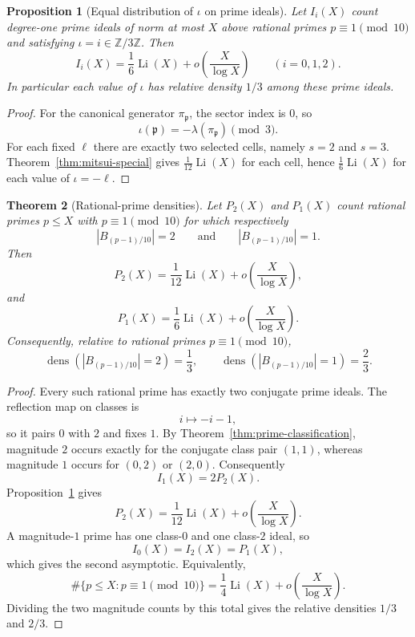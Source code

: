 \documentclass[12pt]{amsart}
\newtheorem{theorem}{Theorem}[section]
\newtheorem{proposition}[theorem]{Proposition}
\theoremstyle{definition}
\theoremstyle{remark}
\newcommand{\ZZ}{\mathbb{Z}}
\begin{document}
\begin{proposition}[Equal distribution of $\iota$ on prime ideals]
\label{prop:iota-density}
Let $I_i(X)$ count degree-one prime ideals of norm at most $X$ above
rational primes $p\equiv1\pmod{10}$ and satisfying
$\iota=i\in\ZZ/3\ZZ$.  Then
\[
  I_i(X)=\frac16\operatorname{Li}(X)
  +o\!\left(\frac{X}{\log X}\right)
  \qquad(i=0,1,2).
\]
In particular each value of $\iota$ has relative density $1/3$ among
these prime ideals.
\end{proposition}

\begin{proof}
For the canonical generator $\pi_{\mathfrak p}$, the sector index is
$0$, so
\[
  \iota(\mathfrak p)=-\lambda(\pi_{\mathfrak p})\pmod3.
\]
For each fixed $\ell$ there are exactly two selected cells, namely
$s=2$ and $s=3$.  Theorem~\ref{thm:mitsui-special} gives
$\frac1{12}\operatorname{Li}(X)$ for each cell, hence
$\frac16\operatorname{Li}(X)$ for each value of $\iota=-\ell$.
\end{proof}

\begin{theorem}[Rational-prime densities]\label{thm:density}
Let $P_2(X)$ and $P_1(X)$ count rational primes $p\leq X$ with
$p\equiv1\pmod{10}$ for which respectively
\[
  \left|B_{(p-1)/10}\right|=2
  \qquad\text{and}\qquad
  \left|B_{(p-1)/10}\right|=1.
\]
Then
\[
  P_2(X)=\frac1{12}\operatorname{Li}(X)
  +o\!\left(\frac{X}{\log X}\right),
\]
and
\[
  P_1(X)=\frac16\operatorname{Li}(X)
  +o\!\left(\frac{X}{\log X}\right).
\]
Consequently, relative to rational primes $p\equiv1\pmod{10}$,
\[
  \operatorname{dens}\left(
    \left|B_{(p-1)/10}\right|=2\right)=\frac13,
  \qquad
  \operatorname{dens}\left(
    \left|B_{(p-1)/10}\right|=1\right)=\frac23.
\]
\end{theorem}

\begin{proof}
Every such rational prime has exactly two conjugate prime ideals.
The reflection map on classes is
\[
  i\longmapsto-i-1,
\]
so it pairs $0$ with $2$ and fixes $1$.  By
Theorem~\ref{thm:prime-classification}, magnitude $2$ occurs exactly
for the conjugate class pair $(1,1)$, whereas magnitude $1$ occurs for
$(0,2)$ or $(2,0)$.  Consequently
\[
  I_1(X)=2P_2(X).
\]
Proposition~\ref{prop:iota-density} gives
\[
  P_2(X)=\frac1{12}\operatorname{Li}(X)
  +o\!\left(\frac{X}{\log X}\right).
\]
A magnitude-$1$ prime has one class-$0$ and one class-$2$ ideal, so
\[
  I_0(X)=I_2(X)=P_1(X),
\]
which gives the second asymptotic.  Equivalently,
\[
  \#\{p\leq X:p\equiv1\pmod{10}\}
  =\frac14\operatorname{Li}(X)
   +o\!\left(\frac{X}{\log X}\right).
\]
Dividing the two magnitude counts by this total gives the relative
densities $1/3$ and $2/3$.
\end{proof}
\end{document}
